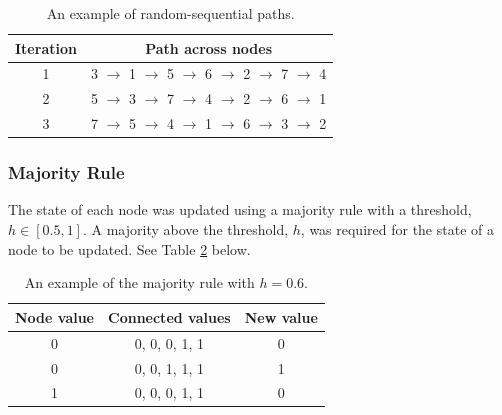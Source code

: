 \documentclass[a4paper, 10pt]{IEEEtran}
\begin{document}
\begin{center} %
	\begin{minipage}{.7\linewidth} %
	\begin{table}[H]
		\centering %
		\renewcommand{\arraystretch}{1.3} %
		\caption{An example of random-sequential paths.}
		\label{tab:paths}
		\begin{tabular}{c | c} %
			Iteration & Path across nodes \\ \hline \hline %
			1 & 3 $\rightarrow$ 1 $\rightarrow$ 5 $\rightarrow$ 6 $\rightarrow$ 2  $\rightarrow$ 7 $\rightarrow$ 4 \\ \hline
			2 & 5 $\rightarrow$ 3  $\rightarrow$ 7 $\rightarrow$ 4 $\rightarrow$ 2 $\rightarrow$ 6 $\rightarrow$ 1 \\ \hline
			3 & 7 $\rightarrow$ 5 $\rightarrow$ 4 $\rightarrow$ 1 $\rightarrow$ 6  $\rightarrow$ 3 $\rightarrow$ 2 \\ \hline
		\end{tabular}
	\end{table}
	\end{minipage}
\end{center}

\vspace{0.5em} %


\subsubsection{Majority Rule}
\label{subsub:majority}

The state of each node was updated using a majority rule with a threshold, $h \in [0.5, 1]$. A majority above the threshold, $h$, was required for the state of a node to be updated. See Table \ref{tab:majority} below.

\begin{center} %
	\begin{minipage}{.7\linewidth} %
	\begin{table}[H]
		\centering %
		\renewcommand{\arraystretch}{1.3} %
		\caption{An example of the majority rule with $h = 0.6$.}
		\label{tab:majority}
		\begin{tabular}{c | c | c} %
			Node value & Connected values & New value\\ \hline \hline %
			0 & 0, 0, 0, 1, 1 & 0 \\ \hline
			0 & 0, 0, 1, 1, 1 & 1 \\ \hline
			1 & 0, 0, 0, 1, 1 & 0 \\ \hline
		\end{tabular}
	\end{table}
	\end{minipage}
\end{center}
\end{document}
